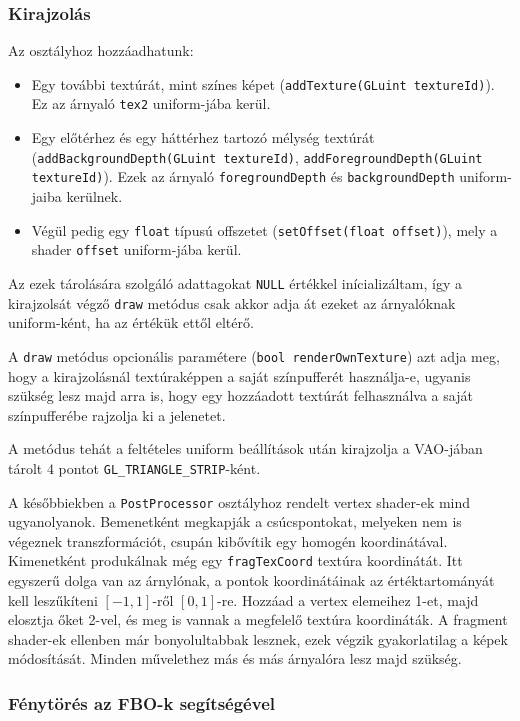 \subsubsection{Kirajzolás}
Az osztályhoz hozzáadhatunk:
\begin{itemize}
\item Egy további textúrát, mint színes képet (\texttt{addTexture(GLuint textureId)}). Ez az árnyaló \texttt{tex2} uniform-jába kerül.
\item Egy előtérhez és egy háttérhez tartozó mélység textúrát (\texttt{addBackgroundDepth(GLuint textureId)}, \texttt{addForegroundDepth(GLuint textureId)}).  Ezek az árnyaló \texttt{foregroundDepth} és \texttt{backgroundDepth} uniform-jaiba kerülnek.
\item Végül pedig egy \texttt{float} típusú offszetet (\texttt{setOffset(float offset)}), mely a shader \texttt{offset} uniform-jába kerül.
\end{itemize}
Az ezek tárolására szolgáló adattagokat \texttt{NULL} értékkel inícializáltam, így a kirajzolsát végző \texttt{draw} metódus csak akkor adja át ezeket az árnyalóknak uniform-ként, ha az értékük ettől eltérő. 

A \texttt{draw} metódus opcionális paramétere (\texttt{bool renderOwnTexture}) azt adja meg, hogy a kirajzolásnál textúraképpen a saját színpufferét használja-e, ugyanis szükség lesz majd arra is, hogy egy hozzáadott textúrát felhasználva a saját színpufferébe rajzolja ki a jelenetet.

A metódus tehát a feltételes uniform beállítások után kirajzolja a VAO-jában tárolt $4$ pontot \texttt{GL\_TRIANGLE\_STRIP}-ként.

A későbbiekben a \texttt{PostProcessor} osztályhoz rendelt vertex shader-ek mind ugyanolyanok. Bemenetként megkapják a csúcspontokat, melyeken nem is végeznek transzformációt, csupán kibővítik egy homogén koordinátával. Kimenetként produkálnak még egy \texttt{fragTexCoord} textúra koordinátát. Itt egyszerű dolga van az árnylónak, a pontok koordinátáinak az értéktartományát kell leszűkíteni $[-1, 1]$-ről $[0, 1]$-re. Hozzáad a vertex elemeihez 1-et, majd elosztja őket 2-vel, és meg is vannak a megfelelő textúra koordináták. A fragment shader-ek ellenben már bonyolultabbak lesznek, ezek végzik gyakorlatilag a képek módosítását. Minden művelethez más és más árnyalóra lesz majd szükség.

\subsubsection{Fénytörés az FBO-k segítségével}





